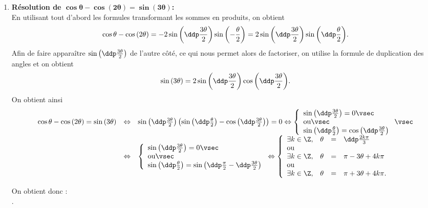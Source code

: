 \begin{correction}
\begin{enumerate}
\newpage
\item  \textbf{R\'esolution de $\mathbf{ \cos{\theta}-\cos{(2\theta)}=\sin{(3\theta)} }$:}\\
\noindent En utilisant tout d'abord les formules transformant les sommes en produits, on obtient
$$\cos{\theta}-\cos{(2\theta)}=-2\sin{\left(\ddp\frac{3\theta}{2}\right)}\sin{\left(-\frac{\theta}{2}\right)}
=2\sin{\left(\ddp\frac{3\theta}{2}\right)}\sin{\left(\ddp\frac{\theta}{2}\right)}.$$
Afin de faire appara\^itre $\sin{\left(\ddp\frac{3\theta}{2}\right)}$ de l'autre c\^ot\'e, ce qui nous permet alors de factoriser, on utilise la formule de duplication des angles et on obtient
$$\sin{(3\theta)}=2\sin{\left(\ddp\frac{3\theta}{2}\right)}\cos{\left(\ddp\frac{3\theta}{2}\right)}.$$
On obtient ainsi
$$\begin{array}{lll}
\cos{\theta}-\cos{(2\theta)}=\sin{(3\theta)}&\Leftrightarrow & 
\sin{\left(\ddp\frac{3\theta}{2}\right)}\left(\sin{\left(\ddp\frac{\theta}{2}\right)}-\cos{\left(\ddp\frac{3\theta}{2}\right)}   \right)=0
\Leftrightarrow 
\left\lbrace\begin{array}{l}
\sin{\left(\ddp\frac{3\theta}{2}\right)}=0\vsec\\
\hbox{ou}\vsec\\
\sin{\left(\ddp\frac{\theta}{2}\right)}=\cos{\left(\ddp\frac{3\theta}{2}\right)}
\end{array}\right.\vsec\\
&\Leftrightarrow & 
\left\lbrace\begin{array}{l}
\sin{\left(\ddp\frac{3\theta}{2}\right)}=0\vsec\\
\hbox{ou}\vsec\\
\sin{\left(\ddp\frac{\theta}{2}\right)}=\sin{\left(\ddp\frac{\pi}{2}-\ddp\frac{3\theta}{2}\right)}
\end{array}\right.
\Leftrightarrow 
\left\lbrace\begin{array}{llll}
\exists k\in\Z,& \theta&=&\ddp\frac{2k\pi}{3}\\
\hbox{ou}\\
\exists k\in\Z,& \theta&=&\pi-3\theta+4k\pi\\
\hbox{ou}\\
\exists k\in\Z,& \theta&=&\pi+3\theta+4k\pi.\\
\end{array}\right.\end{array}$$
\begin{minipage}[c]{0.45\textwidth}
On obtient donc : \vsec\\
\hspace*{-1cm} .
\end{minipage}


\end{enumerate}
\end{correction}
